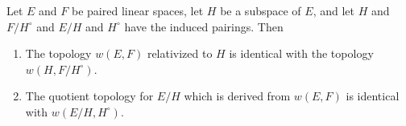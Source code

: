 Let $E$ and $F$ be paired linear spaces, let $H$ be a subspace of $E$, and let $H$ and $F/H^\circ$ and $E/H$ and $H^\circ$ have the induced pairings. Then

\begin{enumerate}
\item[(i)] The topology $w(E,F)$ relativized to $H$ is identical with the topology $w(H, F/H^\circ)$.

\item[(ii)] The quotient topology for $E/H$ which is derived from $w(E,F)$ is identical with $w(E/H, H^\circ)$.
\end{enumerate}
